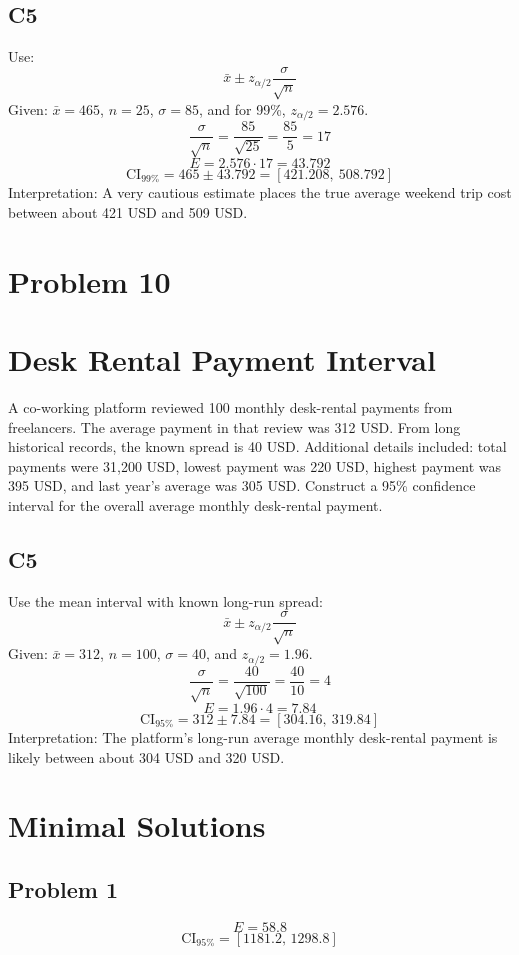 \begin{ExamProblems}
		\subsection*{C5}
		Use:
		\[
		\bar{x} \pm z_{\alpha/2}\frac{\sigma}{\sqrt{n}}
		\]
		Given: $\bar{x}=465$, $n=25$, $\sigma=85$, and for 99\%, $z_{\alpha/2}=2.576$.
		\[
		\frac{\sigma}{\sqrt{n}}=\frac{85}{\sqrt{25}}=\frac{85}{5}=17
		\]
		\[
		E=2.576\cdot 17=43.792
		\]
		\[
		\text{CI}_{99\%}=465\pm 43.792=[421.208,\ 508.792]
		\]
		Interpretation: A very cautious estimate places the true average weekend trip cost between about 421 USD and 509 USD.

		\newpage
		\item
		\section{Problem 10}
		\section{Desk Rental Payment Interval}
		A co-working platform reviewed 100 monthly desk-rental payments from freelancers.
		The average payment in that review was 312 USD.
		From long historical records, the known spread is 40 USD.
		Additional details included: total payments were 31{,}200 USD, lowest payment was 220 USD, highest payment was 395 USD, and last year's average was 305 USD.
		Construct a 95\% confidence interval for the overall average monthly desk-rental payment.

		\subsection*{C5}
		Use the mean interval with known long-run spread:
		\[
		\bar{x} \pm z_{\alpha/2}\frac{\sigma}{\sqrt{n}}
		\]
		Given: $\bar{x}=312$, $n=100$, $\sigma=40$, and $z_{\alpha/2}=1.96$.
		\[
		\frac{\sigma}{\sqrt{n}}=\frac{40}{\sqrt{100}}=\frac{40}{10}=4
		\]
		\[
		E=1.96\cdot 4=7.84
		\]
		\[
		\text{CI}_{95\%}=312\pm 7.84=[304.16,\ 319.84]
		\]
		Interpretation: The platform's long-run average monthly desk-rental payment is likely between about 304 USD and 320 USD.

	\end{ExamProblems}

\section{Minimal Solutions}
\subsection*{Problem 1}
\[
E=58.8
\]
\[
\text{CI}_{95\%}=[1181.2,\,1298.8]
\]

